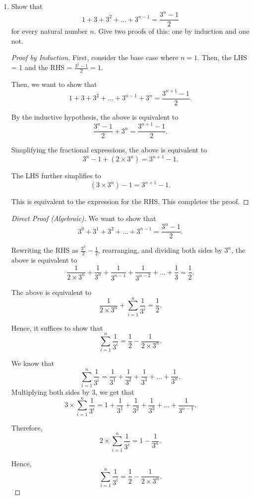 \documentclass[11pt]{article}
\begin{document}
\begin{enumerate}
 \item Show that
\[1+3+3^2+\ldots +3^{n-1}=\frac{3^n-1}{2}\]
for every natural number $n.$
Give two proofs of this:
one by induction and one not.

\begin{proof}[Proof by Induction]
First, consider the base case where $n=1$. Then, the LHS = 1 and the RHS = $\frac{3^1 - 1}{2} = 1$. 

Then, we want to show that
\[
    1 + 3 + 3^2 + \dots + 3^{n-1} + 3^n = \frac{3^{n+1} - 1}{2}.
\]

By the inductive hypothesis, the above is equivalent to
\[
    \frac{3^n-1}{2} + 3^n = \frac{3^{n+1} - 1}{2}.
\]

Simplifying the fractional expressions, the above is equivalent to
\[
    3^n - 1 + (2 \times 3^n) = 3^{n+1} - 1.
\]

The LHS further simplifies to
\[
    (3 \times 3^n) - 1 = 3^{n+1} - 1.
\]

This is equivalent to the expression for the RHS. This completes the proof.

\renewcommand\qedsymbol{QED}

\end{proof}

\begin{proof}[Direct Proof (Algebraic)]

We want to show that 
\[
    3^0 + 3^1 + 3^2 + \dots + 3^{n-1} = \frac{3^n - 1}{2}.
\]

Rewriting the RHS as $\frac{3^n}{2} - \frac{1}{2}$, rearranging, and dividing both sides by $3^n$, the above is equivalent to
\[
    \frac{1}{2 \times 3^n} + \frac{1}{3^n} + \frac{1}{3^{n-1}} + \frac{1}{3^{n-2}} + \dots + \frac{1}{3} = \frac{1}{2}.
\]

The above is equivalent to 
\[
    \frac{1}{2 \times 3^n} + \sum_{i=1}^{n} \frac{1}{3^i} = \frac{1}{2}.
\]

Hence, it suffices to show that
\[
    \sum_{i=1}^{n} \frac{1}{3^i} = \frac{1}{2} - \frac{1}{2 \times 3^n}.
\]

We know that
\[
    \sum_{i=1}^{n} \frac{1}{3^i} = \frac{1}{3^1} + \frac{1}{3^2} + \frac{1}{3^3} + \dots + \frac{1}{3^n}.
\]
Multiplying both sides by 3, we get that
\[
    3 \times \sum_{i=1}^{n} \frac{1}{3^i} = 1 + \frac{1}{3^1} + \frac{1}{3^2} + \frac{1}{3^3} + \dots + \frac{1}{3^{n-1}}.
\]

Therefore,
\[
    2 \times \sum_{i=1}^{n} \frac{1}{3^i} = 1 - \frac{1}{3^n}.
\]

Hence, 
\[
    \sum_{i=1}^{n} \frac{1}{3^i} = \frac{1}{2} - \frac{1}{2 \times 3^n}.
\]


\end{proof}
\end{enumerate}
\end{document}
